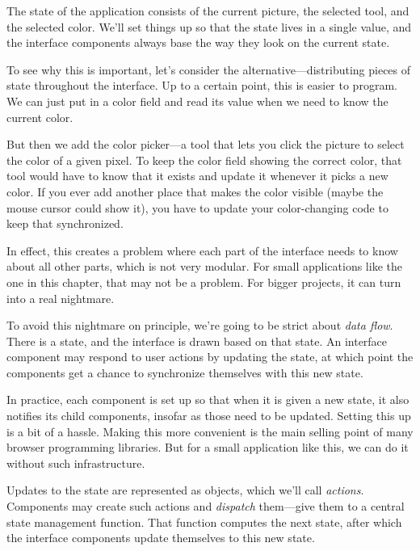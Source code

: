 The state of the application consists of the current picture, the selected tool, and the selected color. We'll set things up so that the state lives in a single value, and the interface components always base the way they look on the current state.

To see why this is important, let's consider the alternative—distributing pieces of state throughout the interface. Up to a certain point, this is easier to program. We can just put in a color field and read its value when we need to know the current color.

But then we add the color picker—a tool that lets you click the picture to select the color of a given pixel. To keep the color field showing the correct color, that tool would have to know that it exists and update it whenever it picks a new color. If you ever add another place that makes the color visible (maybe the mouse cursor could show it), you have to update your color-changing code to keep that synchronized.

In effect, this creates a problem where each part of the interface needs to know about all other parts, which is not very modular. For small applications like the one in this chapter, that may not be a problem. For bigger projects, it can turn into a real nightmare.

To avoid this nightmare on principle, we're going to be strict about \emph{data flow}. There is a state, and the interface is drawn based on that state. An interface component may respond to user actions by updating the state, at which point the components get a chance to synchronize themselves with this new state.

In practice, each component is set up so that when it is given a new state, it also notifies its child components, insofar as those need to be updated. Setting this up is a bit of a hassle. Making this more convenient is the main selling point of many browser programming libraries. But for a small application like this, we can do it without such infrastructure.

Updates to the state are represented as objects, which we'll call \emph{actions}. Components may create such actions and \emph{dispatch} them—give them to a central state management function. That function computes the next state, after which the interface components update themselves to this new state.

